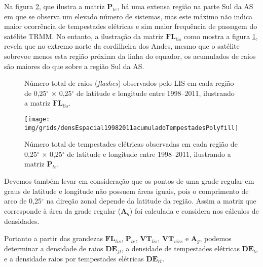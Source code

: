 
Na figura \ref{taxaTotalTe}, que ilustra a matriz $\mathbf{P}_{te}$, há uma extensa região na parte Sul da AS em que se observa um elevado número de sistemas, mas este máximo não indica maior ocorrência de tempestades elétricas e sim maior frequência de passagem do satélite TRMM. No entanto, a ilustração da matriz $\mathbf{FL}_{lis}$ como mostra a figura \ref{taxatotalraios}, revela que no extremo norte da cordilheira dos Andes, mesmo que o satélite sobrevoe menos esta região próxima da linha do equador, os acumulados de raios são maiores do que sobre a região Sul da AS. 


\begin{figure}[!ht]
  \centering
\caption{Número total de raios (\textit{flashes}) observados pelo LIS em cada região de 0,25$^{\circ}$  $\times$ 0,25$^{\circ}$ de latitude e longitude entre 1998--2011, ilustrando a matriz $\mathbf{FL}_{lis}$.}
\label{taxatotalraios}
\end{figure}   
  
\begin{figure}[!ht]
  \centering 
  {{\texttt{[image: img/grids/densEspacial19982011acumuladoTempestadesPolyfill]}}}
\caption{Número total de tempestades elétricas observadas em cada região de 0,25$^{\circ}$ $\times$ 0,25$^{\circ}$ de latitude e longitude entre 1998--2011, ilustrando a matriz $\mathbf{P}_{te}$.}
\label{taxaTotalTe}
\end{figure} 

Devemos também levar em consideração que os pontos de uma grade regular em graus de latitude e longitude não possuem áreas iguais, pois o comprimento de arco de 0,25$^{\circ}$ na direção zonal depende da latitude da região. Assim a matriz que corresponde à área da grade regular ($\mathbf{A}_g$) foi calculada e considera nos cálculos de densidades.

Portanto a partir das grandezas $\mathbf{FL}_{lis}$, $\mathbf{P}_{te}$, $\mathbf{VT}_{lis}$, $\mathbf{VT}_{virs}$ e $\mathbf{A}_g$, podemos determinar a densidade de raios $\mathbf{DE}_{fl}$, a densidade de tempestades elétricas $\mathbf{DE}_{te}$ e a densidade raios por tempestades elétricas $\mathbf{DE}_{rt}$. 

